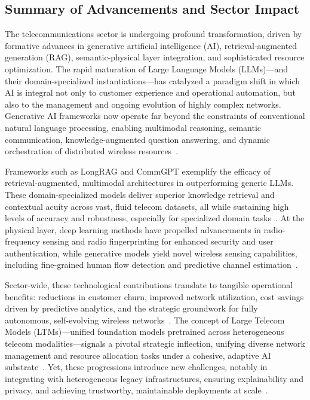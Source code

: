 \documentclass[sigconf]{acmart}
\begin{document}
\subsection{Summary of Advancements and Sector Impact}

The telecommunications sector is undergoing profound transformation, driven by formative advances in generative artificial intelligence (AI), retrieval-augmented generation (RAG), semantic-physical layer integration, and sophisticated resource optimization. The rapid maturation of Large Language Models (LLMs)—and their domain-specialized instantiations—has catalyzed a paradigm shift in which AI is integral not only to customer experience and operational automation, but also to the management and ongoing evolution of highly complex networks. Generative AI frameworks now operate far beyond the constraints of conventional natural language processing, enabling multimodal reasoning, semantic communication, knowledge-augmented question answering, and dynamic orchestration of distributed wireless resources~\cite{ref7,ref16}. 

Frameworks such as LongRAG and CommGPT exemplify the efficacy of retrieval-augmented, multimodal architectures in outperforming generic LLMs. These domain-specialized models deliver superior knowledge retrieval and contextual acuity across vast, fluid telecom datasets, all while sustaining high levels of accuracy and robustness, especially for specialized domain tasks~\cite{ref7,ref16}. At the physical layer, deep learning methods have propelled advancements in radio-frequency sensing and radio fingerprinting for enhanced security and user authentication, while generative models yield novel wireless sensing capabilities, including fine-grained human flow detection and predictive channel estimation~\cite{ref18,ref19,ref21}.

Sector-wide, these technological contributions translate to tangible operational benefits: reductions in customer churn, improved network utilization, cost savings driven by predictive analytics, and the strategic groundwork for fully autonomous, self-evolving wireless networks~\cite{ref16,ref46}. The concept of Large Telecom Models (LTMs)—unified foundation models pretrained across heterogeneous telecom modalities—signals a pivotal strategic inflection, unifying diverse network management and resource allocation tasks under a cohesive, adaptive AI substrate~\cite{ref16}. Yet, these progressions introduce new challenges, notably in integrating with heterogeneous legacy infrastructures, ensuring explainability and privacy, and achieving trustworthy, maintainable deployments at scale~\cite{ref7,ref16,ref17,ref18,ref46}.
\end{document}
